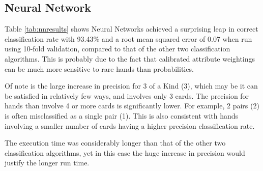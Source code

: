 \documentclass[10pt, a4paper]{article}
\begin{document}
\subsection*{Neural Network}

Table \ref{tab:nnresults} shows Neural Networks achieved a surprising leap in correct classification rate with 93.43\% and a root mean squared error of 0.07 when run using 10-fold validation, compared to that of the other two classification algorithms. This is probably due to the fact that calibrated attribute weightings can be much more sensitive to rare hands than probabilities.

Of note is the large increase in precision for 3 of a Kind (3), which may be it can be satisfied in relatively few ways, and involves only 3 cards. The precision for hands than involve 4 or more cards is significantly lower. For example, 2 pairs (2) is often misclassified as a single pair (1). This is also consistent with hands involving a smaller number of cards having a higher precision classification rate. 

The execution time was considerably longer than that of the other two classification algorithms, yet in this case the huge increase in precision would justify the longer run time.
                 
\end{document}
